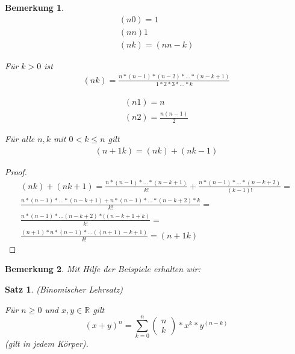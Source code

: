 \documentclass[a4paper,10pt]{article}
\newtheorem{notice}{Bemerkung}
\newtheorem{satz}{Satz}
\begin{document}
\begin{notice}
 \begin{align*}
  (n 0) = 1\\
  (n n) 1\\
  (n k) = (n n-k)
 \end{align*}
 
 Für $k > 0$ ist 
 \begin{align*}
  (n k) = \frac{n * (n - 1) * (n - 2) * \dots * (n - k + 1)}{1 * 2 * 3 * \dots * k}
 \end{align*}
 
 \begin{align*}
  (n 1) = n\\
  (n 2) = \frac{n(n - 1)}{2}
 \end{align*}
 
 Für alle $n, k$ mit $0 < k \le n$ gilt
 \begin{align*}
  (n+1 k) = (n k) + (n k-1)
 \end{align*}
\end{notice}

\begin{proof}
 \begin{align*}
  (n k) + (n k+1) = \frac{n * (n - 1) * \dots * (n - k + 1)}{k!} + \frac{n * (n - 1) * \dots * (n - k + 2)}{(k - 1)!} =\\
  \frac{n * (n - 1) * \dots * (n - k + 1) + n * (n - 1) * \dots * (n - k + 2) * k}{k!} =\\
  \frac{n * (n - 1) * \dots (n - k + 2) * ((n -k + 1 + k)}{k!} =\\
  \frac{(n + 1) * n * (n - 1) * \dots ((n + 1) - k + 1)}{k!} = (n+1 k)
 \end{align*}
\end{proof}

\begin{notice}
 Mit Hilfe der Beispiele erhalten wir: 
\end{notice}

\begin{satz}
 (Binomischer Lehrsatz)
 
 Für $n \ge 0$ und $x, y \in \mathbb{R}$ gilt
 \begin{equation*}
  (x + y)^n = \sum_{k = 0}^n \begin{pmatrix}n\\k\end{pmatrix} * x^k * y^{(n - k)}
 \end{equation*}
 (gilt in jedem Körper).
\end{satz}
\end{document}
